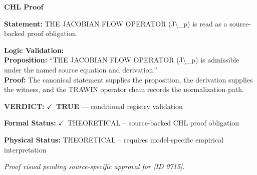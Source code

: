 \vspace{0.45em}
\noindent\textbf{CHL Proof}\par
\textbf{Statement:} THE JACOBIAN FLOW OPERATOR (J\textbackslash{}\_p) is read as a source-backed proof obligation.

\textbf{Logic Validation:}\\
\textbf{Proposition:} ``THE JACOBIAN FLOW OPERATOR (J\textbackslash{}\_p) is admissible under the named source equation and derivation.''\\
\textbf{Proof:} The canonical statement supplies the proposition, the derivation supplies the witness, and the TRAWIN operator chain records the normalization path.

\textbf{VERDICT:} \ensuremath{\checkmark}\ \textbf{TRUE} --- conditional registry validation

\textbf{Formal Status:} \ensuremath{\checkmark}\ THEORETICAL -- source-backed CHL proof obligation

\textbf{Physical Status:} THEORETICAL -- requires model-specific empirical interpretation
\par\vspace{0.45em}
\par
\vfill
\begingroup\footnotesize\itshape
Proof visual pending source-specific approval for [ID 0715].
\par\endgroup
\vfill
\endgroup
\endgroup

